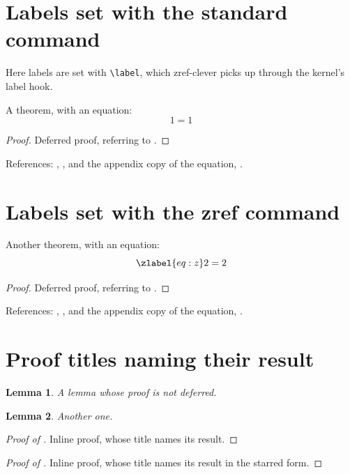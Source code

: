 \documentclass{article}
\newtheorem{lemma}{Lemma}
\begin{document}
\section{Labels set with the standard command}

Here labels are set with \verb|\label|, which \textsf{zref-clever} picks up
through the kernel's label hook.

\begin{theoremrep}
  \label{th:hook}%
  A theorem, with an equation:
  \begin{equation}
    \label{eq:hook}
    1=1
  \end{equation}
\end{theoremrep}

\begin{proof}
  Deferred proof, referring to .
\end{proof}

References: , , and the appendix copy of the
equation, .

\section{Labels set with the zref command}


\begin{theoremrep}
  Another theorem, with an equation:
  \begin{equation}
    \zlabel{eq:z}
    2=2
  \end{equation}
\end{theoremrep}

\begin{proof}
  Deferred proof, referring to .
\end{proof}

References: , , and the appendix copy of the
equation, .

\section{Proof titles naming their result}


\begin{lemma}
  \label{lem:one}%
  A lemma whose proof is not deferred.
\end{lemma}

\begin{lemma}
  \label{lem:two}%
  Another one.
\end{lemma}

\begin{proof}[Proof of ]
  Inline proof, whose title names its result.
\end{proof}

\begin{proof}[Proof of ]
  Inline proof, whose title names its result in the starred form.
\end{proof}
\end{document}
